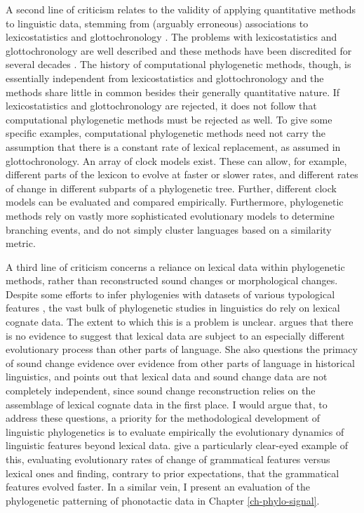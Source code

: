 A second line of criticism relates to the validity of applying quantitative methods to linguistic data, stemming from (arguably erroneous) associations to lexicostatistics and glottochronology \autocites{eska_recent_2004}{holm_new_2007}. The problems with lexicostatistics and glottochronology are well described and these methods have been discredited for several decades \autocite[see][pp.~285--286]{bowern_computational_2018}. The history of computational phylogenetic methods, though, is essentially independent from lexicostatistics and glottochronology and the methods share little in common besides their generally quantitative nature. If lexicostatistics and glottochronology are rejected, it does not follow that computational phylogenetic methods must be rejected as well. To give some specific examples, computational phylogenetic methods need not carry the assumption that there is a constant rate of lexical replacement, as assumed in glottochronology. An array of clock models exist. These can allow, for example, different parts of the lexicon to evolve at faster or slower rates, and different rates of change in different subparts of a phylogenetic tree. Further, different clock models can be evaluated and compared empirically. Furthermore, phylogenetic methods rely on vastly more sophisticated evolutionary models to determine branching events, and do not simply cluster languages based on a similarity metric.

A third line of criticism concerns a reliance on lexical data within phylogenetic methods, rather than reconstructed sound changes or morphological changes. Despite some efforts to infer phylogenies with datasets of various typological features \autocites[e.g.][]{dunn_structural_2005}{dunn_structural_2008}{sicoli_linguistic_2014}, the vast bulk of phylogenetic studies in linguistics do rely on lexical cognate data. The extent to which this is a problem is unclear. \textcite{bowern_computational_2018} argues that there is no evidence to suggest that lexical data are subject to an especially different evolutionary process than other parts of language. She also questions the primacy of sound change evidence over evidence from other parts of language in historical linguistics, and points out that lexical data and sound change data are not completely independent, since sound change reconstruction relies on the assemblage of lexical cognate data in the first place. I would argue that, to address these questions, a priority for the methodological development of linguistic phylogenetics is to evaluate empirically the evolutionary dynamics of linguistic features beyond lexical data. \textcite{greenhill_evolutionary_2017} give a particularly clear-eyed example of this, evaluating evolutionary rates of change of grammatical features versus lexical ones and finding, contrary to prior expectations, that the grammatical features evolved faster. In a similar vein, I present an evaluation of the phylogenetic patterning of phonotactic data in Chapter \ref{ch-phylo-signal}.

